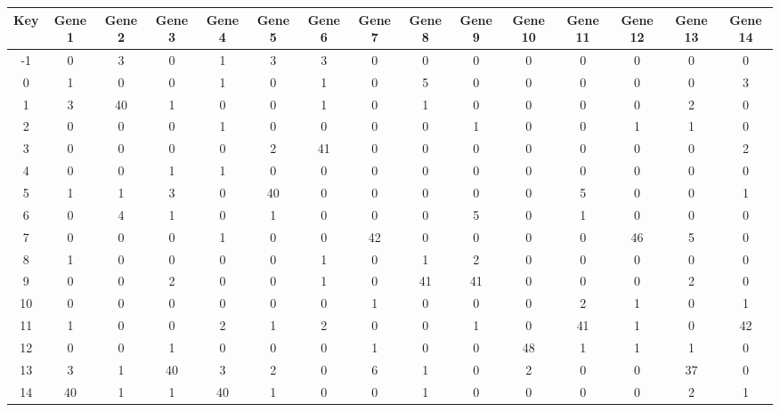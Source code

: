 \begin{tabular}{|c|c|c|c|c|c|c|c|c|c|c|c|c|c|c|}
\hline
Key & Gene 1 & Gene 2 & Gene 3 & Gene 4 & Gene 5 & Gene 6 & Gene 7 & Gene 8 & Gene 9 & Gene 10 & Gene 11 & Gene 12 & Gene 13 & Gene 14 \\
\hline
-1 & 0 & 3 & 0 & 1 & 3 & 3 & 0 & 0 & 0 & 0 & 0 & 0 & 0 & 0 \\
0 & 1 & 0 & 0 & 1 & 0 & 1 & 0 & 5 & 0 & 0 & 0 & 0 & 0 & 3 \\
1 & 3 & 40 & 1 & 0 & 0 & 1 & 0 & 1 & 0 & 0 & 0 & 0 & 2 & 0 \\
2 & 0 & 0 & 0 & 1 & 0 & 0 & 0 & 0 & 1 & 0 & 0 & 1 & 1 & 0 \\
3 & 0 & 0 & 0 & 0 & 2 & 41 & 0 & 0 & 0 & 0 & 0 & 0 & 0 & 2 \\
4 & 0 & 0 & 1 & 1 & 0 & 0 & 0 & 0 & 0 & 0 & 0 & 0 & 0 & 0 \\
5 & 1 & 1 & 3 & 0 & 40 & 0 & 0 & 0 & 0 & 0 & 5 & 0 & 0 & 1 \\
6 & 0 & 4 & 1 & 0 & 1 & 0 & 0 & 0 & 5 & 0 & 1 & 0 & 0 & 0 \\
7 & 0 & 0 & 0 & 1 & 0 & 0 & 42 & 0 & 0 & 0 & 0 & 46 & 5 & 0 \\
8 & 1 & 0 & 0 & 0 & 0 & 1 & 0 & 1 & 2 & 0 & 0 & 0 & 0 & 0 \\
9 & 0 & 0 & 2 & 0 & 0 & 1 & 0 & 41 & 41 & 0 & 0 & 0 & 2 & 0 \\
10 & 0 & 0 & 0 & 0 & 0 & 0 & 1 & 0 & 0 & 0 & 2 & 1 & 0 & 1 \\
11 & 1 & 0 & 0 & 2 & 1 & 2 & 0 & 0 & 1 & 0 & 41 & 1 & 0 & 42 \\
12 & 0 & 0 & 1 & 0 & 0 & 0 & 1 & 0 & 0 & 48 & 1 & 1 & 1 & 0 \\
13 & 3 & 1 & 40 & 3 & 2 & 0 & 6 & 1 & 0 & 2 & 0 & 0 & 37 & 0 \\
14 & 40 & 1 & 1 & 40 & 1 & 0 & 0 & 1 & 0 & 0 & 0 & 0 & 2 & 1 \\
\hline
\end{tabular}